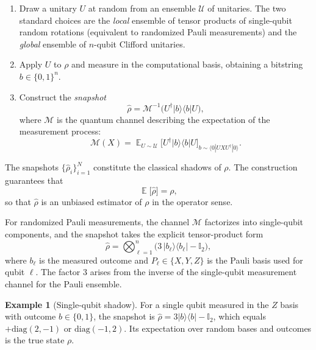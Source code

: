 \documentclass[12pt,a4paper,oneside]{book}
\theoremstyle{plain}
\theoremstyle{definition}
\newtheorem{example}[theorem]{Example}
\theoremstyle{remark}
\DeclareMathOperator{\E}{\mathbb{E}}
\begin{document}
\begin{enumerate}
    \item Draw a unitary $U$ at random from an ensemble $\mathcal{U}$ of unitaries. The two standard choices are the \emph{local} ensemble of tensor products of single-qubit random rotations (equivalent to randomized Pauli measurements) and the \emph{global} ensemble of $n$-qubit Clifford unitaries.
    \item Apply $U$ to $\rho$ and measure in the computational basis, obtaining a bitstring $b \in \{0,1\}^n$.
    \item Construct the \emph{snapshot}
    \begin{equation}
        \label{eq:snapshot}
        \hat{\rho} = \mathcal{M}^{-1}\bigl(U^\dagger |b\rangle\langle b| U\bigr),
    \end{equation}
    where $\mathcal{M}$ is the quantum channel describing the expectation of the measurement process:
    \begin{equation}
        \mathcal{M}(X) = \E_{U \sim \mathcal{U}}\bigl[ U^\dagger |b\rangle\langle b| U \bigr]_{b \sim \langle 0|U X U^\dagger|0\rangle}.
    \end{equation}
\end{enumerate}

The snapshots $\{\hat{\rho}_i\}_{i=1}^{N}$ constitute the classical shadows of $\rho$. The construction guarantees that
\begin{equation}
    \E\bigl[\hat{\rho}\bigr] = \rho,
\end{equation}
so that $\hat{\rho}$ is an unbiased estimator of $\rho$ in the operator sense.

For randomized Pauli measurements, the channel $\mathcal{M}$ factorizes into single-qubit components, and the snapshot takes the explicit tensor-product form \cite{huang2020predicting}
\begin{equation}
    \label{eq:snapshot_pauli}
    \hat{\rho} = \bigotimes_{\ell=1}^{n} \bigl(3\,|b_\ell\rangle\langle b_\ell| - \mathbb{I}_2\bigr),
\end{equation}
where $b_\ell$ is the measured outcome and $P_\ell \in \{X, Y, Z\}$ is the Pauli basis used for qubit $\ell$. The factor $3$ arises from the inverse of the single-qubit measurement channel for the Pauli ensemble.

\begin{example}[Single-qubit shadow]
For a single qubit measured in the $Z$ basis with outcome $b \in \{0,1\}$, the snapshot is $\hat{\rho} = 3|b\rangle\langle b| - \mathbb{I}_2$, which equals $+\text{diag}(2,-1)$ or $\text{diag}(-1,2)$. Its expectation over random bases and outcomes is the true state $\rho$.
\end{example}
\end{document}
